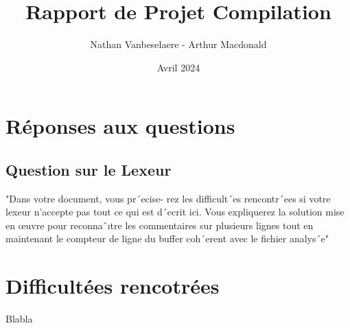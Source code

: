 \documentclass{report}
\title{\textbf{\Huge Rapport de Projet Compilation }}
\author{Nathan Vanbeselaere - Arthur Macdonald}
\date{Avril 2024}
\begin{document}
\maketitle
\newpage

\tableofcontents
\newpage

\chapter*{Réponses aux questions}
    \section*{Question sur le Lexeur}

        "Dans votre document, vous pr´ecise-
    rez les difficult´es rencontr´ees si votre lexeur n’accepte pas tout ce qui est d´ecrit ici.
    Vous expliquerez la solution mise en œuvre pour reconnaˆıtre les commentaires sur
    plusieurs lignes tout en maintenant le compteur de ligne du buffer coh´erent avec le fichier
    analys´e"



\chapter*{Difficultées rencotrées}
    Blabla
\end{document}
